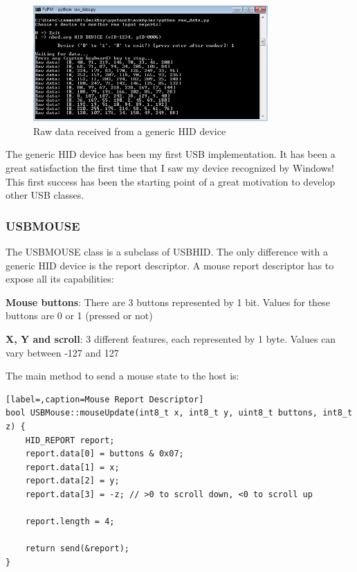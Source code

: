 \documentclass[pdftex,10pt,a4paper]{report}
\newenvironment{packed_item}{
\begin{itemize}
  \setlength{\itemsep}{1pt}
  \setlength{\parskip}{0pt}
  \setlength{\parsep}{0pt}
}{\end{itemize}}
\begin{document}
\begin{figure}[h!]
		\centering
		\includegraphics[width=0.8\textwidth]{./hid_py_raw_data.jpg}
		\caption{Raw data received from a generic HID device}
		\label{Raw data received from a generic HID device}
\end{figure}

The generic HID device has been my first USB implementation. It has been a great satisfaction the first time that I saw my device recognized by Windows! This first success has been the starting point of a great motivation to develop other USB classes. 


\subsubsection{USBMOUSE}
The USBMOUSE class is a subclass of USBHID. The only difference with a generic HID device is the report descriptor. A mouse report descriptor has to expose all its capabilities:
\begin{packed_item}
	\item \textbf{Mouse buttons}: There are 3 buttons represented by 1 bit. Values for these buttons are 0 or 1 (pressed or not)
	\item \textbf{X, Y and scroll}: 3 different features, each represented by 1 byte. Values can vary between -127 and 127
\end{packed_item}

The main method to send a mouse state to the host is:
\begin{lstlisting}[label=,caption=Mouse Report Descriptor]
bool USBMouse::mouseUpdate(int8_t x, int8_t y, uint8_t buttons, int8_t z) {
    HID_REPORT report;
    report.data[0] = buttons & 0x07;
    report.data[1] = x;
    report.data[2] = y;
    report.data[3] = -z; // >0 to scroll down, <0 to scroll up

    report.length = 4;

    return send(&report);
}
\end{lstlisting}
\end{document}
